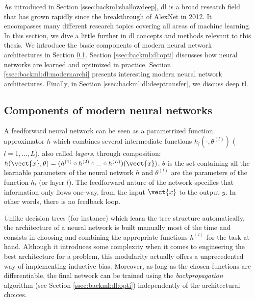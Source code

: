 As introduced in Section \ref{ssec:backml:shallowdeep}, \acrlong{dl} is a broad research field that has grown rapidly since the breakthrough of AlexNet in 2012. It encompasses many different research topics covering all areas of machine learning. In this section, we dive a little further in \acrlong{dl} concepts and methods relevant to this thesis. We introduce the basic components of modern neural network architectures in Section \ref{ssec:backml:dp:components}. Section \ref{ssec:backml:dl:opti} discusses how neural networks are learned and optimized in practice. Section \ref{ssec:backml:dl:modernarchi} presents interesting modern neural network architectures. Finally, in Section \ref{ssec:backml:dl:deeptransfer}, we discuss deep \acrlong{tl}.   

\subsection{Components of modern neural networks}
\label{ssec:backml:dp:components}

A feedforward neural network can be seen as a parametrized function approximator $h$ which combines several intermediate functions $h_l(\cdot, \theta^{(l)})$ ($l=1, ..., L$), also called \textit{layers}, through composition: $h(\vect{x}, \theta) = (h^{(1)} \circ h^{(2)} \circ ... \circ h^{(L)})(\vect{x})$. $\theta$ is the set containing all the learnable parameters of the neural network $h$ and $\theta^{(l)}$ are the parameters of the function $h_l$ (or layer $l$). The feedforward nature of the network specifies that information only flows one-way, from the input $\vect{x}$ to the output $y$. In other words, there is no feedback loop.

Unlike decision trees (for instance) which learn the tree structure automatically, the architecture of a neural network is built manually most of the time and consists in choosing and combining the appropriate functions $h^{(l)}$ for the task at hand. Although it introduces some complexity when it comes to engineering the best architecture for a problem, this modularity actually offers a unprecedented way of implementing inductive bias. Moreover, as long as the chosen functions are differentiable, the final network can be trained using the \textit{backpropagation} algorithm (see Section \ref{ssec:backml:dl:opti}) independently of the architectural choices.

